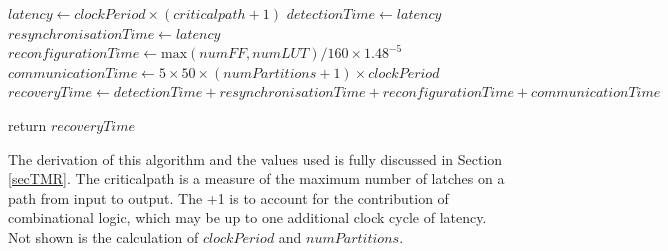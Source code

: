 \documentclass[12pt,final,oneside]{dwThesis} %
\begin{document}
\begin{algorithm}
      \begin{algorithmic}
         [1]  
         \State
         $latency \gets clockPeriod\times{}(criticalpath+1)$ 
         \State
         $detectionTime \gets latency$ 
         \State $resynchronisationTime \gets
         latency$ 
         \State $reconfigurationTime \gets \mbox{max}(numFF,
         numLUT)/160\times 1.48^{-5}$ 
         \State $communicationTime \gets 5\times
         50\times(numPartitions+1)\times clockPeriod$ 
         \State $recoveryTime
         \gets
         detectionTime+resynchronisationTime+reconfigurationTime+communicationTime$

         \State return $recoveryTime$ \EndProcedure 
      \end{algorithmic}


   \end{algorithm}
   The derivation of this algorithm and the values used is
   fully discussed in Section \ref{secTMR}. The criticalpath is a measure of
   the maximum number of latches on a path from input to output. The +1 is to
   account for the contribution of combinational logic, which may be up to one
   additional clock cycle of latency.  Not shown is the calculation of
   $clockPeriod$ and $numPartitions$.



   \newpage 
\end{document}
